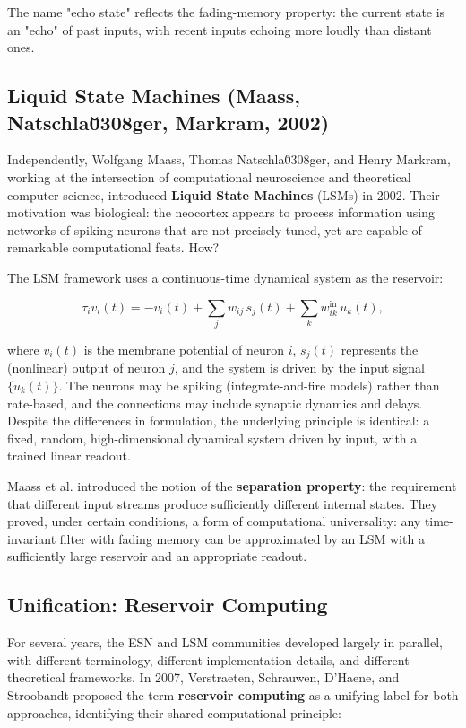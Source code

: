 The name "echo state" reflects the fading-memory property: the current state is an "echo" of past inputs, with recent inputs echoing more loudly than distant ones.

\subsection{Liquid State Machines (Maass, Natschla\u0308ger, Markram, 2002)}\label{sec:13.5.2}

Independently, Wolfgang Maass, Thomas Natschla\u0308ger, and Henry Markram, working at the intersection of computational neuroscience and theoretical computer science, introduced \textbf{Liquid State Machines} (LSMs) in 2002. Their motivation was biological: the neocortex appears to process information using networks of spiking neurons that are not precisely tuned, yet are capable of remarkable computational feats. How?

The LSM framework uses a continuous-time dynamical system as the reservoir:

\[
\tau_i \dot{v}_i(t) = -v_i(t) + \sum_j w_{ij}\, s_j(t) + \sum_k w_{ik}^{\text{in}}\, u_k(t),
\]

where $v_i(t)$ is the membrane potential of neuron $i$, $s_j(t)$ represents the (nonlinear) output of neuron $j$, and the system is driven by the input signal $\{u_k(t)\}$. The neurons may be spiking (integrate-and-fire models) rather than rate-based, and the connections may include synaptic dynamics and delays. Despite the differences in formulation, the underlying principle is identical: a fixed, random, high-dimensional dynamical system driven by input, with a trained linear readout.

Maass et al. introduced the notion of the \textbf{separation property}: the requirement that different input streams produce sufficiently different internal states. They proved, under certain conditions, a form of computational universality: any time-invariant filter with fading memory can be approximated by an LSM with a sufficiently large reservoir and an appropriate readout.

\subsection{Unification: Reservoir Computing}\label{sec:13.5.3}

For several years, the ESN and LSM communities developed largely in parallel, with different terminology, different implementation details, and different theoretical frameworks. In 2007, Verstraeten, Schrauwen, D'Haene, and Stroobandt proposed the term \textbf{reservoir computing} as a unifying label for both approaches, identifying their shared computational principle:


